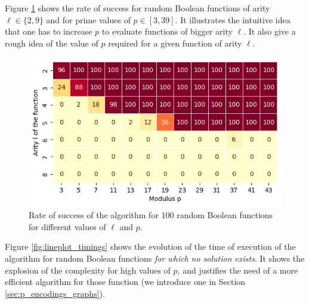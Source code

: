 Figure \ref{fig:heatmap_success} shows the rate of success for random Boolean functions of arity $\ell \in \{2, 9\}$ and for prime values of $p \in [3, 39]$. It illustrates the intuitive idea that one has to increase $p$ to evaluate functions of bigger arity $\ell$. It also give a rough idea of the value of $p$ required for a given function of arity $\ell$.

\begin{figure}
    \centering
    \includegraphics[]{img/p_encodings/heatmap_success.png}
    \caption{Rate of success of the algorithm for 100 random Boolean functions for different values of $\ell$ and $p$.}
    \label{fig:heatmap_success}
\end{figure}


Figure \ref{fig:lineplot_timings} shows the evolution of the time of execution of the algorithm for random Boolean functions \emph{for which no solution exists}. It shows the explosion of the complexity for high values of $p$, and justifies the need of a more efficient algorithm for those function (we introduce one in Section \ref{sec:p_encodings_graphs}).  



